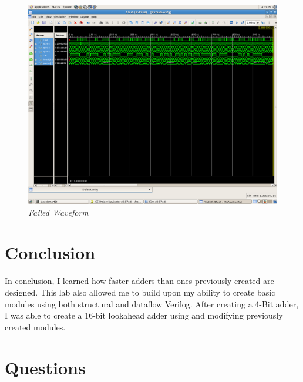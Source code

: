 \documentclass[a4paper,12pt]{article}
\begin{document}
\newpage

\begin{figure}[h]
  \begin{center}
    \includegraphics[scale=.2]{exp3_failedWaveform.png}
    \caption{\textit{Failed Waveform}}
  \end{center}
\end{figure}


\section*{Conclusion}

  In conclusion, I learned how faster adders than ones previously created are designed. This lab also allowed me to build upon my ability to create basic modules using both structural and dataflow Verilog. After creating a 4-Bit adder, I was able to create a 16-bit lookahead adder using and modifying previously created modules.

\section*{Questions}
\end{document}
